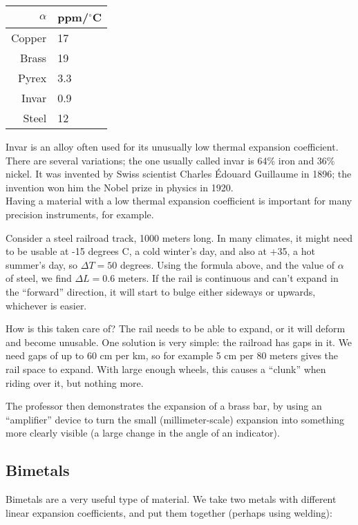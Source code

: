 \begin{center}
\begin{tabular}{|r|l|}
\hline
$\alpha$ & ppm/${}^\circ$C\\ \hline
Copper & 17\\\
Brass & 19\\
Pyrex & 3.3\\
Invar & 0.9\\
Steel & 12\\
\hline
\end{tabular}
\end{center}

Invar is an alloy often used for its unusually low thermal expansion coefficient. There are several variations; the one usually called invar is 64\% iron and 36\% nickel. It was invented by Swiss scientist Charles \'{E}douard Guillaume in 1896; the invention won him the Nobel prize in physics in 1920.\\
Having a material with a low thermal expansion coefficient is important for many precision instruments, for example.

Consider a steel railroad track, 1000 meters long. In many climates, it might need to be usable at -15 degrees C, a cold winter's day, and also at +35, a hot summer's day, so $\Delta T = 50$ degrees. Using the formula above, and the value of $\alpha$ of steel, we find $\Delta L = 0.6$ meters. If the rail is continuous and can't expand in the ``forward'' direction, it will start to bulge either sideways or upwards, whichever is easier.

How is this taken care of? The rail needs to be able to expand, or it will deform and become unusable. One solution is very simple: the railroad has gaps in it. We need gaps of up to 60 cm per km, so for example 5 cm per 80 meters gives the rail space to expand. With large enough wheels, this causes a ``clunk'' when riding over it, but nothing more.

The professor then demonstrates the expansion of a brass bar, by using an ``amplifier'' device to turn the small (millimeter-scale) expansion into something more clearly visible (a large change in the angle of an indicator).

\subsection{Bimetals}

Bimetals are a very useful type of material. We take two metals with different linear expansion coefficients, and put them together (perhaps using welding):

